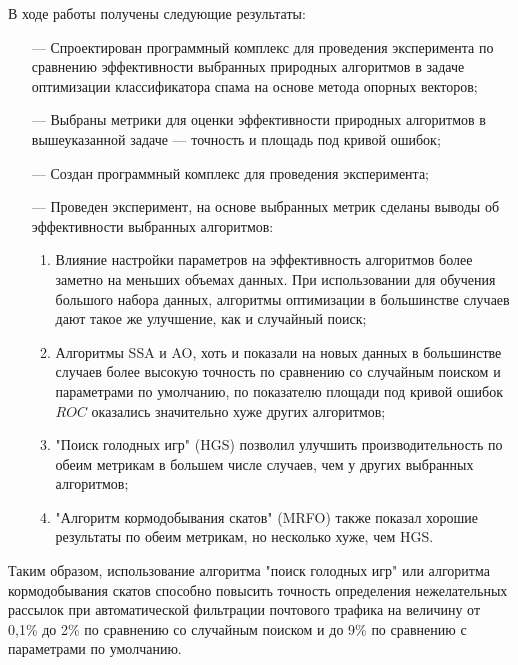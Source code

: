 В ходе работы получены следующие результаты:
\begin{itemize}
    \item[—] Спроектирован программный комплекс для проведения эксперимента по сравнению эффективности 
        выбранных природных алгоритмов в задаче оптимизации классификатора спама на основе метода опорных векторов;
    \item[—] Выбраны метрики для оценки эффективности природных алгоритмов в 
        вышеуказанной задаче — точность и площадь под кривой ошибок; 
    \item[—] Создан программный комплекс для проведения эксперимента;
    \item[—] Проведен эксперимент, на основе выбранных метрик сделаны выводы об 
    эффективности выбранных алгоритмов:
        \begin{enumerate}
            \item Влияние настройки параметров на эффективность алгоритмов более заметно на меньших объемах данных. 
            При использовании для обучения большого набора данных, 
            алгоритмы оптимизации в большинстве случаев дают такое же улучшение, как и случайный поиск;
            
            \item Алгоритмы SSA и AO, хоть и показали на новых данных в большинстве случаев 
            более высокую точность по сравнению со случайным поиском и параметрами по умолчанию, по показателю площади 
            под кривой ошибок $ROC$ оказались значительно хуже других алгоритмов;
            
            \item "Поиск голодных игр" (HGS) позволил улучшить производительность по обеим метрикам в большем числе 
            случаев, чем у других выбранных алгоритмов;

            \item "Алгоритм кормодобывания скатов" (MRFO) также показал хорошие результаты по обеим метрикам, но 
            несколько хуже, чем HGS.
        \end{enumerate}
\end{itemize}

Таким образом, использование алгоритма "поиск голодных игр" или алгоритма кормодобывания скатов 
способно повысить точность определения нежелательных рассылок при автоматической фильтрации 
почтового трафика на величину от 0,1\% до 2\% по сравнению со случайным поиском и до 9\% по сравнению с 
параметрами по умолчанию.

